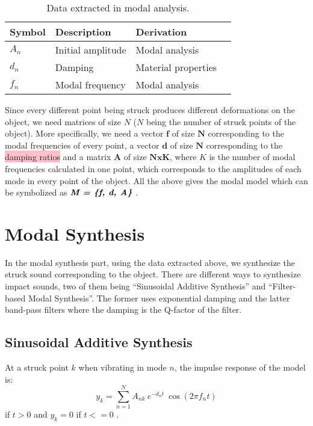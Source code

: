 \begin{table}
	\centering
    \begin{tabular}{ | l | l | l | p{5cm} |}
    \hline
    \textbf{Symbol} & \textbf{Description} & \textbf{Derivation} \\ \hline
    $A_n$ & Initial amplitude & Modal analysis \\ \hline
    $d_n$ & Damping & Material properties \\ \hline
    $f_n$ & Modal frequency & Modal analysis \\
    \hline
    \end{tabular}
    \caption{Data extracted in modal analysis.}
    \label{tab:extracted_data}
\end{table} 

Since every different point being struck produces different deformations on the object, we need matrices of size $N$ ($N$ being the number of struck points of the object). More specifically, we need a vector $\textbf{f}$ of size $\textbf{N}$ corresponding to the modal frequencies of every point, a vector $\textbf{d}$ of size $\textbf{N}$ corresponding to the \colorbox{pink}{damping ratios} and a matrix $\textbf{A}$ of size $\textbf{NxK}$, where $K$ is the number of modal frequencies calculated in one point, which corresponds to the amplitudes of each mode in every point of the object. All the above gives the modal model which can be symbolized as $\textbf{\textit{M = \{f, d, A\}}}$ \cite{van2001foleyautomatic}.
 
\section{Modal Synthesis}\label{sec:modal_synth}
In the modal synthesis part, using the data extracted above, we synthesize the struck sound corresponding to the object. There are different ways to synthesize impact sounds, two of them being ``Sinusoidal Additive Synthesis'' and ``Filter-based Modal Synthesis''. The former uses exponential damping and the latter band-pass filters where the damping is the Q-factor of the filter. 

\subsection{Sinusoidal Additive Synthesis}\label{sec:sin_synth}
At a struck point $k$ when vibrating in mode $n$, the impulse response of the model is:
\begin{equation}\label{eq:modal_response}
y_k = \sum\limits_{n=1}^{N} A_{nk}\ e^{-d_n t}\ \cos(2 \pi f_nt)
\end{equation}
if $t>0$ and $y_k = 0$ if $t<=0$ \cite{van2001foleyautomatic}.

